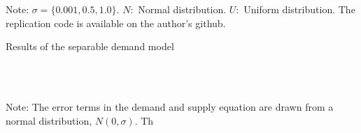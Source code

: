 \documentclass[11pt, a4paper]{article}
\theoremstyle{remark}
\begin{document}
\begin{table}[!htbp]
    \caption{True parameters and distributions}
    \label{tb:parameter_setting}
    \begin{center}
    \end{center}
    \footnotesize
    Note: $\sigma=\{0.001, 0.5, 1.0\}$. $N:$ Normal distribution. $U:$ Uniform distribution. The replication code is available on the author's github.
\end{table}

\begin{table}[!htbp]
  \begin{center}
      \caption{Results of the separable demand model}
      \label{tb:counterexample_for_Lau1982_sigma_0.001_bias_rmse} 
      \subfloat[$\sigma=0.001$]{}\\
      \subfloat[$\sigma=0.5$]{}\\
      \subfloat[$\sigma=1.0$]{}
  \end{center}
  \footnotesize
  Note: The error terms in the demand and supply equation are drawn from a normal distribution, $N(0,\sigma)$. Th
\end{table} 
\end{document}
